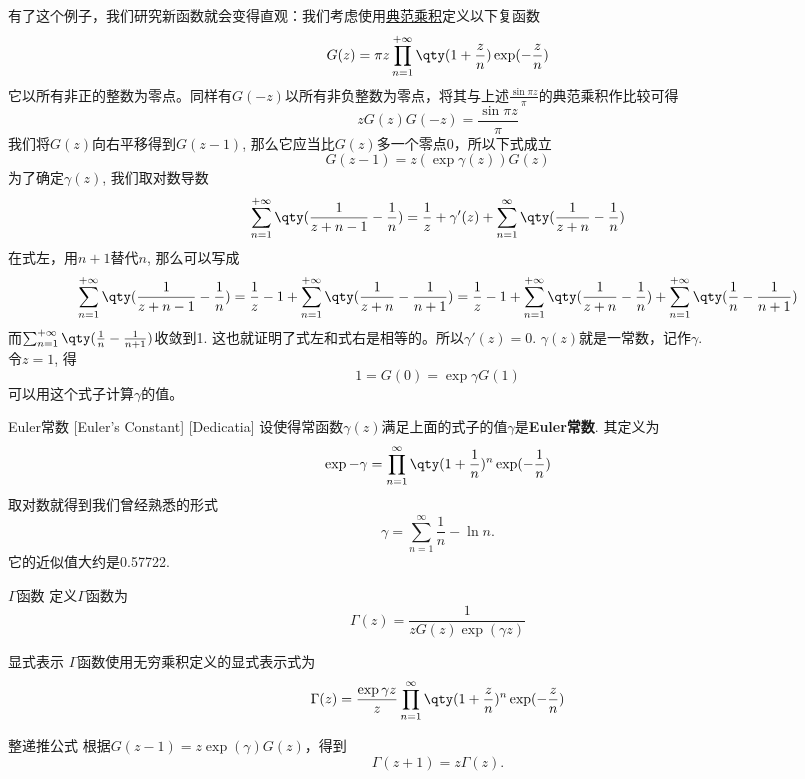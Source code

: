 \documentclass[UTF8]{ctexart}
\begin{document}
        有了这个例子，我们研究新函数就会变得直观：我们考虑使用\hyperref[dfn:CanonicalProduct]{典范乘积}定义以下复函数
        \[G(z)=\pi z\prod_{n=1}^{+\infty}\qty(1+\frac{z}{n})\exp(-\frac{z}{n})\]
        它以所有非正的整数为零点。同样有$G(-z)$以所有非负整数为零点，将其与上述$\frac{\sin\pi z}{\pi}$的典范乘积作比较可得
        \[zG(z)G(-z)=\frac{\sin\pi z}{\pi}\]
        我们将$G(z)$向右平移得到$G(z-1)$, 那么它应当比$G(z)$多一个零点0，所以下式成立
        \[G(z-1)=z(\exp\gamma(z))G(z)\]
        为了确定$\gamma(z)$, 我们取对数导数
        \[\sum_{n=1}^{+\infty}\qty(\frac{1}{z+n-1}-\frac{1}{n})=\frac{1}{z}+\gamma'(z)+\sum_{n=1}^{\infty}\qty(\frac{1}{z+n}-\frac{1}{n})\]
        在式左，用$n+1$替代$n$, 那么可以写成
        \[\sum_{n=1}^{+\infty}\qty(\frac{1}{z+n-1}-\frac{1}{n})=\frac{1}{z}-1+\sum_{n=1}^{+\infty}\qty(\frac{1}{z+n}-\frac{1}{n+1})=\frac{1}{z}-1+\sum_{n=1}^{+\infty}\qty(\frac{1}{z+n}-\frac{1}{n})+\sum_{n=1}^{+\infty}\qty(\frac{1}{n}-\frac{1}{n+1})\]
        而$\sum_{n=1}^{+\infty}\qty(\frac{1}{n}-\frac{1}{n+1})$收敛到1. 这也就证明了式左和式右是相等的。所以$\gamma'(z)=0$. $\gamma(z)$就是一常数，记作$\gamma$.\\
        令$z=1$, 得
        \[1=G(0)=\exp\gamma G(1)\]
        可以用这个式子计算$\gamma$的值。

        \begin{dfn}
            [EulerConstant]
            {Euler常数}
            [Euler's Constant]
            [Dedicatia]
            设使得常函数$\gamma(z)$满足上面的式子的值$\gamma$是\textbf{Euler常数}. 其定义为
            \[\exp -\gamma=\prod_{n=1}^{\infty}\qty(1+\frac{1}{n})^n\exp(-\frac{1}{n})\]
            取对数就得到我们曾经熟悉的形式
            \[\gamma=\sum_{n=1}^{\infty}\frac{1}{n}-\ln n.\]
            它的近似值大约是0.57722.
        \end{dfn}

        \begin{dfn}
            {$\Gamma$函数}
            定义$\Gamma$函数为
            \[\Gamma(z)=\frac{1}{zG(z)\exp(\gamma z)}\]
        \end{dfn}

        \begin{dfn}
            {显式表示}
            $\Gamma$函数使用无穷乘积定义的显式表示式为
            \[\Gamma(z)=\frac{\exp\gamma z}{z}\prod_{n=1}^{\infty}\qty(1+\frac{z}{n})^n\exp(-\frac{z}{n})\]
        \end{dfn}

        \begin{ppt}
            {整递推公式}
            根据$G(z-1)=z\exp(\gamma)G(z)$，得到
            \[\Gamma(z+1)=z\Gamma(z).\]
        \end{ppt}
\end{document}
